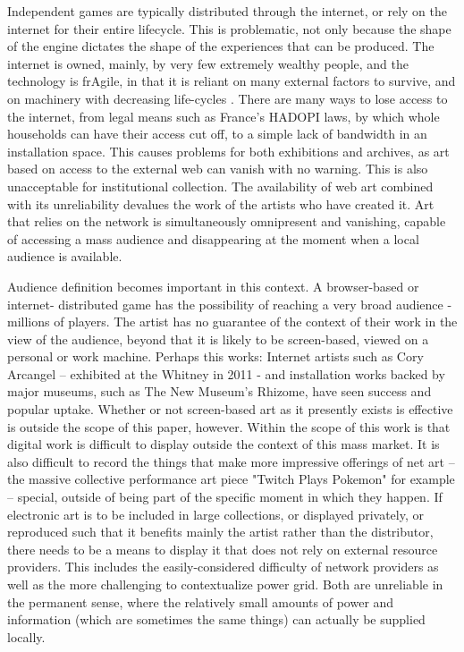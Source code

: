 Independent games are typically distributed through the internet, or rely on the internet for their entire lifecycle. This is problematic, not only because the shape of the engine dictates the shape of the experiences that can be produced. The internet is owned, mainly, by very few extremely wealthy people, and the technology is frAgile, in that it is reliant on many external factors to survive, and on machinery with decreasing life-cycles \parencite{lisanotes}. There are many ways to lose access to the internet, from legal means such as France's HADOPI laws, by which whole households can have their access cut off, to a simple lack of bandwidth in an installation space. This causes problems for both exhibitions and archives, as art based on access to the external web can vanish with no warning. This is also unacceptable for institutional collection. The availability of web art combined with its unreliability devalues the work of the artists who have created it. Art that relies on the network is simultaneously omnipresent and vanishing, capable of accessing a mass audience and disappearing at the moment when a local audience is available.

Audience definition becomes important in this context. A browser-based or internet- distributed game has the possibility of reaching a very broad audience - millions of players. The artist has no guarantee of the context of their work in the view of the audience, beyond that it is likely to be screen-based, viewed on a personal or work machine. Perhaps this works: Internet artists such as Cory Arcangel – exhibited at the Whitney in 2011 - and installation works backed by major museums, such as The New Museum's Rhizome, have seen success and popular uptake. Whether or not screen-based art as it presently exists is effective is outside the scope of this paper, however. Within the scope of this work is that digital work is difficult to display outside the context of this mass market. It is also difficult to record the things that make more impressive offerings of net art – the massive collective performance art piece "Twitch Plays Pokemon" \parencite{twitchplayspokemon} for example – special, outside of being part of the specific moment in which they happen. If electronic art is to be included in large collections, or displayed privately, or reproduced such that it benefits mainly the artist rather than the distributor, there needs to be a means to display it that does not rely on external resource providers. This includes the easily-considered difficulty of network providers as well as the more challenging to contextualize power grid. Both are unreliable in the permanent sense, where the relatively small amounts of power and information (which are sometimes the same things) can actually be supplied locally.

